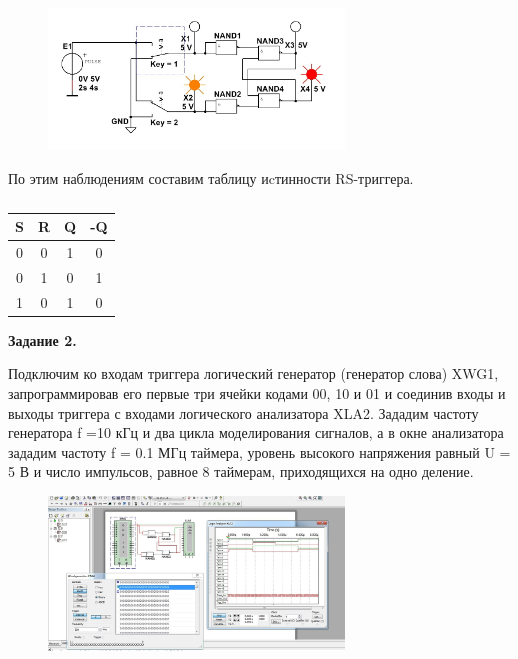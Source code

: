 \documentclass[spec, och, labwork]{shiza}
\begin{document}
\begin{figure}[H]
    \centering
    \includegraphics[width=0.7\textwidth]{img/image8}
    \caption{}
\end{figure}

По этим наблюдениям составим таблицу иcтинности RS-триггера.

\begin{table}[H]
    \caption{}
    \label{tabular:timesandtenses}
    \begin{center}
    \begin{tabular}{|c|c|c|c|}
        \hline
    S & R & Q & -Q  \\ \hline
    0 & 0 & 1 & 0 \\ \hline
    0 & 1 & 0 & 1 \\ \hline
    1 & 0 & 1 & 0   \\ \hline
    \end{tabular}
    \end{center}
\end{table}

\textbf{Задание 2.}

Подключим ко входам триггера логический генератор (генератор слова) XWG1, запрограммировав его первые три ячейки кодами 00, 10 и 01 и соединив входы и выходы триггера с входами логического анализатора XLA2. Зададим частоту генератора f =10 кГц и два цикла моделирования сигналов, а в окне анализатора зададим частоту f = 0.1 МГц таймера, уровень высокого напряжения равный U = 5 В и число импульсов, равное 8 таймерам, приходящихся на одно деление. 

\begin{figure}[H]
    \centering
    \includegraphics[width=0.7\textwidth]{img/image9}
    \caption{}
\end{figure}
\end{document}
